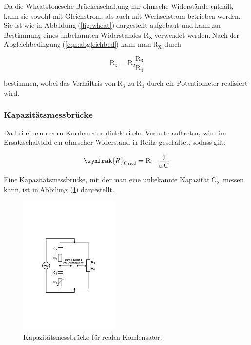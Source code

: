 \noindent
Da die Wheatstonesche Brückenschaltung nur ohmsche Widerstände enthält, kann sie sowohl mit Gleichstrom, 
als auch mit Wechselstrom betrieben werden.
Sie ist wie in Abbildung (\ref{fig:wheat}) dargestellt aufgebaut und kann zur Bestimmung eines unbekannten Widerstandes $\text{R}_\text{X}$ verwendet werden.
Nach der Abgleichbedingung (\ref{eqn:abgleichbed}) kann man $\text{R}_\text{X}$ durch

\begin{equation}
\text{R}_\text{X} = \text{R}_2 \frac{\text{R}_3}{\text{R}_4}
\end{equation}

\noindent
bestimmen, wobei das Verhältnis von $\text{R}_3$ zu $\text{R}_4$ durch ein Potentiometer realisiert wird.

\subsubsection{Kapazitätsmessbrücke}
Da bei einem realen Kondensator dielektrische Verluste auftreten, wird im Ersatzschaltbild ein ohmscher Widerstand in Reihe geschaltet, sodass gilt:

\begin{equation}
\symfrak{R}_\text{Creal}= \text{R}-\frac{\text{j}}{\omega \text{C}}
\label{eqn:r_creal}
\end{equation}

\noindent
Eine Kapazitätsmessbrücke, mit der man eine unbekannte Kapazität $\text{C}_\text{X}$ messen kann, ist in Abbilung (\ref{fig:kap}) dargestellt.

\newpage
\begin{figure}
            \centering
               \includegraphics[height=7cm]{kapazitaet.pdf}
               \caption{Kapazitätsmessbrücke für realen Kondensator.}
               \label{fig:kap}
        \end{figure}

